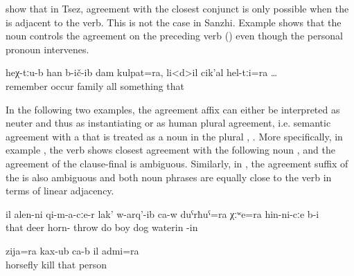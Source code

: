 \citet{Polinsky.etal2009} show that in Tsez, agreement with the closest conjunct is only possible when the  is adjacent to the verb. This is not the case in Sanzhi. Example  shows that the noun   controls the agreement on the preceding verb () even though the personal pronoun intervenes.
%
\begin{exe}
	\ex	\label{ex:‎‎And there I remembered my family and everything}
	\gll	heχ-tːu-b	han	b-ič-ib	dam	kulpat=ra,	li<d>il	cik'al	hel-tːi=ra \ldots\\
			remember	occur		family	all	something	that\\
	\glt	{}
\end{exe}

In the following two examples, the agreement affix  can either be interpreted as neuter and thus as instantiating  or as human plural agreement, i.e. semantic agreement with a  that is treated as a noun in the plural , . More specifically, in example , the verb shows closest  agreement with the following noun  , and the agreement of the clause-final    is ambiguous. Similarly, in , the agreement suffix of the   is also ambiguous and both noun phrases are equally close to the verb in terms of linear adjacency.
%
\begin{exe}
	\ex	\label{ex:‎The deer on its horns threw the boy and the dog into the water}
	\gll	il	alen-ni	qi-m-a-cːe-r	lak'	w-arq'-ib	ca-w	duˁrħuˁ=ra	χːʷe=ra	hin-ni-cːe	b-i\\
		that	deer	horn-	throw	do		boy\tsc{=add}	dog	waterin	-in\\
	\glt	{}

	\ex	\label{ex:‎The other shot at the forehead and killed the horsefly and the man}
	\gll	zija=ra	kax-ub	ca-b	il	admi=ra\\
		horsefly	kill		that	person\\
	\glt	{}
\end{exe}


